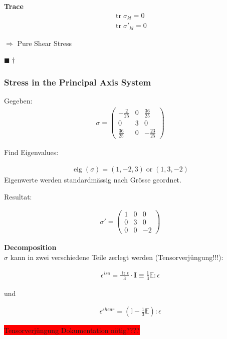 \documentclass[a4paper]{scrartcl}
\newcommand{\qed}{\begin{flushright}
$\blacksquare \dagger$ \end{flushright}}
\begin{document}
\textbf{Trace}\\

\begin{align}
\operatorname{tr}\sigma_{kl}=0 \\
\operatorname{tr}\sigma'_{kl}=0 
\end{align}

$\Rightarrow$ Pure Shear Stress
\qed
\subsubsection{Stress in the Principal Axis System}
Gegeben:
\begin{align}
\sigma=\begin{pmatrix}
-\frac{2}{25} & 0 & \frac{36}{25} \\
0 & 3 & 0 \\
\frac{36}{25}& 0 & -\frac{23}{25}
\end{pmatrix}
\end{align}

Find Eigenvalues:

\begin{align}
\operatorname{eig}(\sigma)=\left(1,-2, 3\right) \operatorname{or}
\left(1,3,-2\right)
\end{align}
Eigenwerte werden standardmässig nach Grösse geordnet. 


Resultat:

\begin{align}
\sigma'=\begin{pmatrix}
1 & 0 & 0 \\
0 & 3 & 0 \\
0 & 0 & -2
\end{pmatrix}
\end{align}

\textbf{Decomposition}\\

$\sigma$ kann in zwei verschiedene Teile zerlegt werden (Tensorverjüngung!!!):

\begin{align}
\epsilon^{iso}=\frac{\operatorname{tr} \epsilon}{3} \cdot \mathbf{I} \equiv
\frac{1}{3} \mathbb{E} : \epsilon
\end{align}

und

\begin{align}
\epsilon^{shear}= \left(\mathbb{I}- \frac{1}{3}\mathbb{E} \right) : \epsilon
\end{align}

\colorbox{red}{Tensorverjüngung Dokumentation nötig????}
\end{document}
